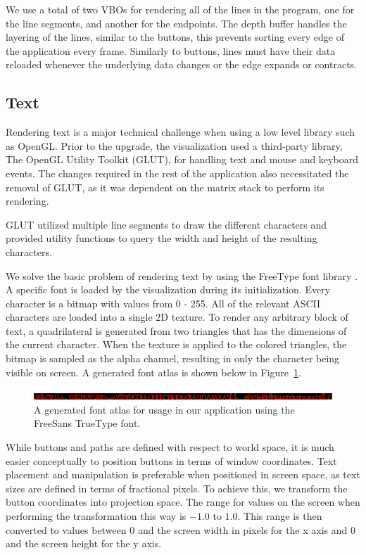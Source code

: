 We use a total of two VBOs for rendering all of the lines in the program, one for the line segments,
and another for the endpoints. The depth buffer handles the layering of the lines, similar to the buttons, this prevents sorting every edge of the application every frame. Similarly to buttons, lines must have their data reloaded whenever the underlying data changes or the edge expands or contracts. 

\subsection{Text}
\label{subsection:text}

Rendering text is a major technical challenge when using a low level library such as OpenGL\@. 
Prior to the upgrade, the visualization used a third-party library, The OpenGL Utility Toolkit (GLUT), 
\cite{glut_website} for handling text and mouse and keyboard events. The changes required in the rest of the application also necessitated the removal of GLUT, as it was dependent on the matrix 
stack to perform its rendering.

GLUT utilized multiple line segments to draw the different characters and provided utility functions
to query the width and height of the resulting characters.

We solve the basic problem of rendering text by using the FreeType font library 
\cite{freetype_website}. A specific font is loaded by the visualization during its initialization. 
Every character is a bitmap with values from 0 - 255. All of the relevant ASCII 
characters are loaded into a single 2D texture. To render any arbitrary block of text, 
a quadrilateral is generated from two triangles that has the dimensions of the current 
character. When the texture is applied to the colored triangles, the bitmap is sampled 
as the alpha channel, resulting in only the character being visible on screen. A generated font atlas is shown below in Figure~\ref{fig:font_atlas}.

\begin{figure}[htp] \centering
    \includegraphics[width=1.0\linewidth]{img/font_atlas.jpg}
    \caption[Font Atlas]{A generated font atlas for usage in our application using the FreeSans TrueType font.}
    \label{fig:font_atlas}
\end{figure}


While buttons and paths are defined with respect to world space, it is much easier conceptually
to position buttons in terms of window coordinates. Text placement and manipulation is preferable 
when positioned in screen space, as text sizes are defined in terms of fractional pixels.
To achieve this, we transform the button coordinates into projection space. The range for values 
on the screen when performing the transformation this way is $-1.0$ to $1.0$. This range is then converted to 
values between 0 and the screen width in pixels for the x axis and 0 and the screen height for the y axis. 

